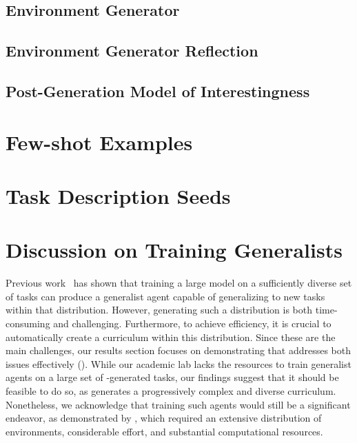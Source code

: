 \documentclass{article} %
\begin{document}
\subsection{Environment Generator}
\label{appendix:env-gen-prompts}



\subsection{Environment Generator Reflection}
\label{appendix:env-gen-reflect-prompts}



\subsection{Post-Generation Model of Interestingness}
\label{appendix:model-of-int-prompts}



\newpage
\section{Few-shot Examples}
\label{appendix:few-shot-examples}
% 





\newpage
\section{Task Description Seeds}
\label{appendix:task-desc-seeds}




\newpage
\section{Discussion on Training Generalists}
\label{appendix:generalists}
Previous work~\citep{bauer_HumanTimescaleAdaptationOpenEnded_2023} has shown that training a large model on a sufficiently diverse set of tasks can produce a generalist agent capable of generalizing to new tasks within that distribution. However, generating such a distribution is both time-consuming and challenging. Furthermore, to achieve efficiency, it is crucial to automatically create a curriculum within this distribution. Since these are the main challenges, our results section focuses on demonstrating that \ours{} addresses both issues effectively ().
While our academic lab lacks the resources to train generalist agents on a large set of \ours{}-generated tasks, our findings suggest that it should be feasible to do so, as \ours{} generates a progressively complex and diverse curriculum. Nonetheless, we acknowledge that training such agents would still be a significant endeavor, as demonstrated by \citet{bauer_HumanTimescaleAdaptationOpenEnded_2023}, which required an extensive distribution of environments, considerable effort, and substantial computational resources.
\end{document}
